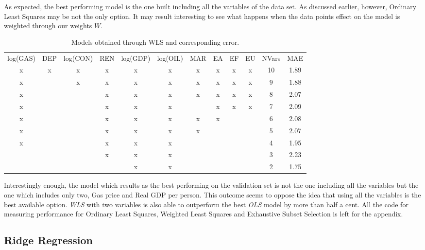 \documentclass{book}
\begin{document}
As expected, the best performing model is the one built including all the variables of the data set. As discussed earlier, however, Ordinary Least Squares may be not the only option. It may result interesting to see what happens when the data points effect on the model is weighted through our weights $W$.

\bigskip
\begin{table}[H]
\begin{center}
\begin{tabular}{|c|c|c|c|c|c|c|c|c|c|c|c|}
\hline
\rowcolor{maroon} \multicolumn{12}{|c|}{Mean Absolute Error, WLS}\\
\hline
log(GAS)&DEP&log(CON)&REN&log(GDP)&log(OIL)&MAR&EA&EF&EU&NVars&MAE\\
\hline
x&x&x&x&x&x&x&x&x&x&10&1.89\\
x&&x&x&x&x&x&x&x&x&9&1.88\\
x&&&x&x&x&x&x&x&x&8&2.07\\
x&&&x&x&x&&x&x&x&7&2.09\\
x&&&x&x&x&x&x&&&6&2.08\\
x&&&x&x&x&x&&&&5&2.07\\
x&&&x&x&x&&&&&4&1.95\\
&&&x&x&x&&&&&3&2.23\\
&&&&x&x&&&&&2&1.75\\
\hline
\end{tabular}
\caption{Models obtained through WLS and corresponding error.}
\end{center}
\end{table}
\bigskip

Interestingly enough, the model which results as the best performing on the validation set is not the one including all the variables but the one which includes only two, Gas price and Real GDP per person. This outcome seems to oppose the idea that using all the variables is the best available option. \textit{WLS} with two variables is also able to outperform the best \textit{OLS} model by more than half a cent. All the code for measuring performance for Ordinary Least Squares, Weighted Least Squares and Exhaustive Subset Selection is left for the appendix.

\subsection{Ridge Regression}
\end{document}
